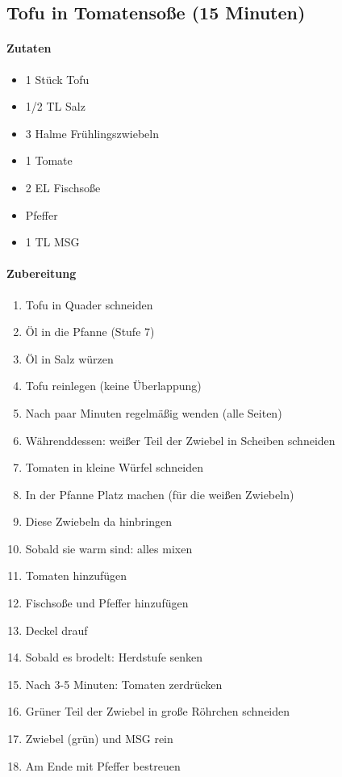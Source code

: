 \newpage
\subsection{Tofu in Tomatensoße (15 Minuten)}
\paragraph{Zutaten}
\begin{itemize}[noitemsep]
	\item 1 Stück Tofu 
	\item 1/2 TL Salz
	\item 3 Halme Frühlingszwiebeln
	\item 1 Tomate
	\item 2 EL Fischsoße
	\item Pfeffer 
	\item 1 TL MSG
\end{itemize}
\paragraph{Zubereitung}
\begin{enumerate}[noitemsep]
	\item Tofu in Quader schneiden
	\item Öl in die Pfanne (Stufe 7)
	\item Öl in Salz würzen
	\item Tofu reinlegen (keine Überlappung)
	\item Nach paar Minuten regelmäßig wenden (alle Seiten)
	\item Währenddessen: weißer Teil der Zwiebel in Scheiben schneiden
	\item Tomaten in kleine Würfel schneiden
	\item In der Pfanne Platz machen (für die weißen Zwiebeln)
	\item Diese Zwiebeln da hinbringen
	\item Sobald sie warm sind: alles mixen
	\item Tomaten hinzufügen
	\item Fischsoße und Pfeffer hinzufügen 
	\item Deckel drauf
	\item Sobald es brodelt: Herdstufe senken
	\item Nach 3-5 Minuten: Tomaten zerdrücken
	\item Grüner Teil der Zwiebel in große Röhrchen schneiden
	\item Zwiebel (grün) und MSG rein
	\item Am Ende mit Pfeffer bestreuen
\end{enumerate}
